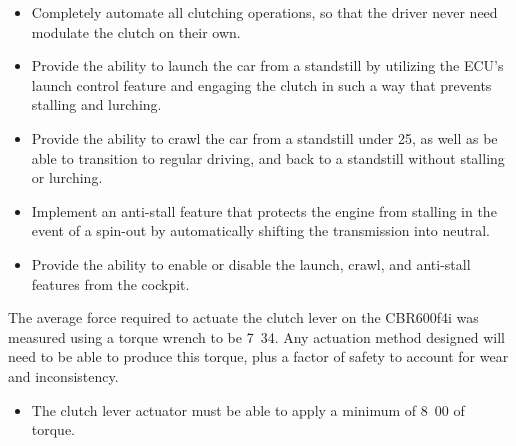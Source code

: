 \begin{itemize}
\item Completely automate all clutching operations, so that the driver never need modulate the clutch on their own.
\item Provide the ability to launch the car from a standstill by utilizing the ECU's launch control feature and engaging the clutch in such a way that prevents stalling and lurching.
\item Provide the ability to crawl the car from a standstill under \unit{25}{\kilo\metre\per\hour}, as well as be able to transition to regular driving, and back to a standstill without stalling or lurching.
\item Implement an anti-stall feature that protects the engine from stalling in the event of a spin-out by automatically shifting the transmission into neutral.
\item Provide the ability to enable or disable the launch, crawl, and anti-stall features from the cockpit.
\end{itemize}
  
The average force required to actuate the clutch lever on the CBR600f4i was measured using a torque wrench to be \unit{7.34}{\newton\metre}. Any actuation method designed will need to be able to produce this torque, plus a factor of safety to account for wear and inconsistency.

\begin{itemize}
\item The clutch lever actuator must be able to apply a minimum of \unit{8.00}{\newton\metre} of torque.
\end{itemize}  
